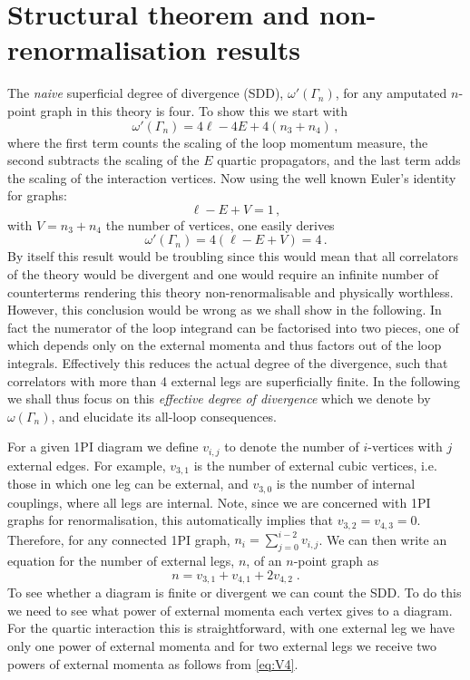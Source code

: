 \documentclass[a4paper,11pt]{article}
\begin{document}
   
\section{Structural theorem and non-renormalisation results}\label{sec:Non-renormalisation theorem}
The \emph{naive} superficial degree of divergence (SDD), $\omega'(\Gamma_n)$, for any amputated $n$-point
graph in this theory is four. To show this we start with 
\begin{equation}
    \omega'(\Gamma_n)= 4\ell-4E+4(n_3+n_4)\,,
\end{equation}
where the first term counts the scaling of the loop momentum measure, the second subtracts the scaling of the $E$ quartic propagators, and the last term adds the scaling of the interaction vertices. Now using the well known Euler's identity for graphs:
\begin{equation}\label{eq:Eulers_thrm}
    \ell-E+V=1 \,,
\end{equation}
with $V=n_3+n_4$ the number of vertices, one easily derives
\begin{equation}
\label{eq:naivesdd}
    \omega'(\Gamma_n)= 4(\ell-E+V)=4\,.
\end{equation}
By itself this result would be troubling since this would mean that all correlators of the theory would be divergent and one would require an infinite number of counterterms rendering this theory non-renormalisable and physically worthless. However, this conclusion would be wrong as we shall show in the following. In fact the numerator of the loop integrand can be factorised  
into two pieces, one of which depends only on the external momenta and thus factors out of the loop integrals. Effectively this reduces the actual degree of the divergence, such that correlators with more than 4 external legs are superficially finite. In the following we shall thus focus on this \textit{effective degree of divergence} which we denote by $\omega(\Gamma_n)$, and elucidate its all-loop consequences.

For a given 1PI diagram we define $v_{i,j}$ to denote the number of $i$-vertices with $j$ external edges. For example, $v_{3,1}$ is the number of external cubic vertices, i.e. those in which one leg can be external, and $v_{3,0}$ is the number of internal couplings, where all legs are internal. Note, since we are concerned with 1PI graphs for renormalisation, this automatically implies that $v_{3,2}=v_{4,3}=0$. Therefore, for any connected 1PI graph, $n_i=\sum_{j=0}^{i-2} v_{i,j}$. We can then write an equation for the number of external legs, $n$, of an $n$-point graph as 
\begin{equation}
\label{eq:nrel}
    n =v_{3,1} + v_{4,1}+ 2v_{4,2}\;.
\end{equation}
To see whether a diagram is finite or divergent we can count the SDD. To do this we need to see what power of external momenta each vertex gives to a diagram. For the quartic interaction this is straightforward, with one external leg we have only one power of external momenta and for two external legs we receive two powers of external momenta as follows from \cref{eq:V4}.
\end{document}
